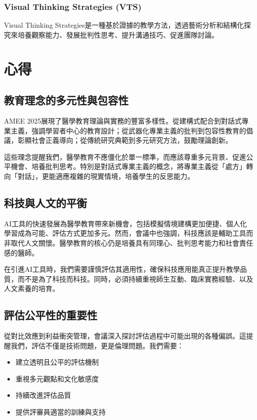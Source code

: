 \documentclass[12pt,a4paper]{article}
\begin{document}
\subsubsection{Visual Thinking Strategies (VTS)}

Visual Thinking Strategies是一種基於證據的教學方法，透過藝術分析和結構化探究來培養觀察能力、發展批判性思考、提升溝通技巧、促進團隊討論。

\section{心得}

\subsection{教育理念的多元性與包容性}

AMEE 2025展現了醫學教育理論與實務的豐富多樣性。從建構式配合到對話式專業主義，強調學習者中心的教育設計；從武器化專業主義的批判到包容性教育的倡議，彰顯社會正義導向；從傳統研究典範到多元研究方法，鼓勵理論創新。

這些理念提醒我們，醫學教育不應僵化於單一標準，而應該尊重多元背景、促進公平機會、培養批判思考。特別是對話式專業主義的概念，將專業主義從「處方」轉向「對話」，更能適應複雜的現實情境，培養學生的反思能力。

\subsection{科技與人文的平衡}

AI工具的快速發展為醫學教育帶來新機會，包括模擬情境建構更加便捷、個人化學習成為可能、評估方式更加多元。然而，會議中也強調，科技應該是輔助工具而非取代人文關懷。醫學教育的核心仍是培養具有同理心、批判思考能力和社會責任感的醫師。

在引進AI工具時，我們需要謹慎評估其適用性，確保科技應用能真正提升教學品質，而不是為了科技而科技。同時，必須持續重視師生互動、臨床實務經驗、以及人文素養的培育。

\subsection{評估公平性的重要性}

從對比效應到利益衝突管理，會議深入探討評估過程中可能出現的各種偏誤。這提醒我們，評估不僅是技術問題，更是倫理問題。我們需要：

\begin{itemize}[nosep]
    \item 建立透明且公平的評估機制
    \item 重視多元觀點和文化敏感度
    \item 持續改進評估品質
    \item 提供評審員適當的訓練與支持
\end{itemize}
\end{document}
